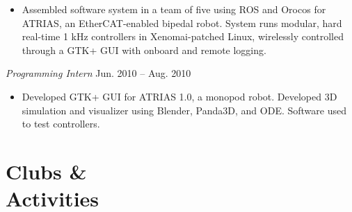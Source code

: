 \documentclass[10pt,letterpaper,margin]{res}
\begin{document}
\begin{resume}
\begin{itemize}
	\item Assembled software system in a team of five using ROS and Orocos for
		ATRIAS, an EtherCAT-enabled bipedal robot. System runs modular, hard
		real-time 1 kHz controllers in Xenomai-patched Linux, wirelessly
		controlled through a GTK+ GUI with onboard and remote logging.


\end{itemize}

{\it Programming Intern} \hfill {\color{lightgray} Jun. 2010 -- Aug. 2010}\vspace{0.0em}

\begin{itemize}
	\item Developed GTK+ GUI for ATRIAS 1.0, a monopod robot. Developed 3D
		simulation and visualizer using Blender, Panda3D, and ODE. Software
		used to test controllers.
\end{itemize}



\section{Clubs \& \\ Activities}


\end{resume}
\end{document}
